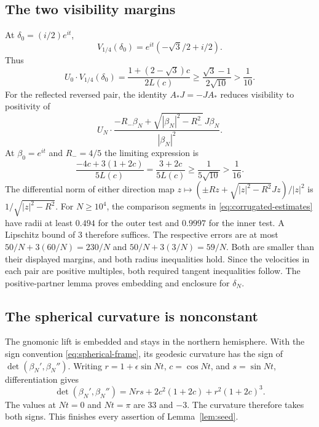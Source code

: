 \documentclass[11pt]{amsart}
\theoremstyle{definition}
\theoremstyle{remark}
\numberwithin{equation}{section}
\begin{document}
\subsection{The two visibility margins}
At $\delta_0=(i/2)e^{it}$,
\[
 V_{1/4}(\delta_0)=e^{it}(-\sqrt3/2+i/2).
\]
Thus
\begin{equation}\label{eq:outer-limit-visibility}
 U_0\cdot V_{1/4}(\delta_0)
 =\frac{1+(2-\sqrt3)c}{2L(c)}
 \ge\frac{\sqrt3-1}{2\sqrt{10}}>\frac1{10}.
\end{equation}
For the reflected reversed pair, the identity $A_*J=-JA_*$ reduces
visibility to positivity of
\[
 U_N\cdot\frac{-R_-\beta_N+
             \sqrt{|\beta_N|^2-R_-^2}\,J\beta_N}{|\beta_N|^2}.
\]
At $\beta_0=e^{it}$ and $R_-=4/5$ the limiting expression is
\begin{equation}\label{eq:inner-limit-visibility}
 \frac{-4c+3(1+2c)}{5L(c)}
 =\frac{3+2c}{5L(c)}\ge\frac1{5\sqrt{10}}>\frac1{16}.
\end{equation}
The differential norm of either direction map
$z\mapsto(\pm Rz+\sqrt{|z|^2-R^2}Jz)/|z|^2$ is
$1/\sqrt{|z|^2-R^2}$. For $N\ge10^4$, the comparison segments in
\eqref{eq:corrugated-estimates} have radii at least $0.494$ for the
outer test and $0.9997$ for the inner test. A Lipschitz bound of $3$
therefore suffices. The respective errors are at most
$50/N+3(60/N)=230/N$ and $50/N+3(3/N)=59/N$.
Both are smaller than their displayed margins, and both radius
inequalities hold. Since the velocities in each pair are positive
multiples, both required tangent inequalities follow. The positive-partner
lemma proves embedding and enclosure for $\delta_N$.

\subsection{The spherical curvature is nonconstant}
The gnomonic lift is embedded and stays in the northern hemisphere.
With the sign convention \eqref{eq:spherical-frame}, its geodesic
curvature has the sign of $\det(\beta_N',\beta_N'')$. Writing
$r=1+\epsilon\sin Nt$, $c=\cos Nt$, and $s=\sin Nt$, differentiation gives
\[
 \det(\beta_N',\beta_N'')
 =Nr s+2c^2(1+2c)+r^2(1+2c)^3.
\]
The values at $Nt=0$ and $Nt=\pi$ are $33$ and $-3$.
The curvature therefore takes both signs. This finishes every assertion
of Lemma~\ref{lem:seed}.
\end{document}
